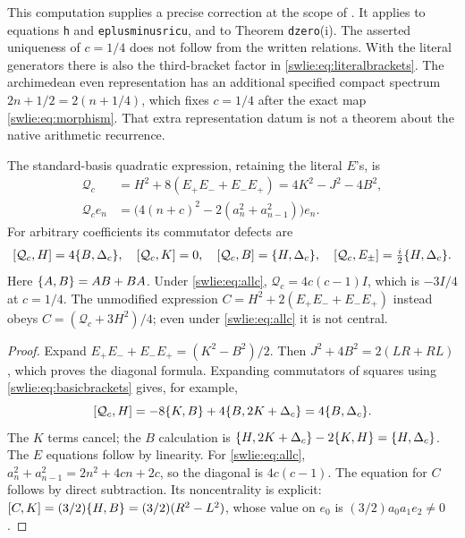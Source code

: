 This computation supplies a precise correction at the scope
of \cite{swlie:CCM}. It applies to equations \texttt{h} and
\texttt{eplusminusricu}, and to Theorem \texttt{dzero}(i).
The asserted uniqueness of $c=1/4$ does not follow from the
written relations. With the literal generators there is
also the third-bracket factor in \eqref{swlie:eq:literalbrackets}.
The archimedean even representation has an additional
specified compact spectrum $2n+1/2=2(n+1/4)$, which fixes
$c=1/4$ after the exact map \eqref{swlie:eq:morphism}.
That extra representation datum is not a theorem about
the native arithmetic recurrence.

\begin{swlieproposition}
\label{swlie:prop:casimir}
The standard-basis quadratic expression, retaining the
literal $E$'s, is
\begin{equation}\label{swlie:eq:Cas}
 \begin{split}
 \mathcal Q_c
 &=H^2+8(E_+E_-+E_-E_+)
   =4K^2-J^2-4B^2,\\
 \mathcal Q_ce_n
 &=\bigl(4(n+c)^2-2(a_n^2+a_{n-1}^2)\bigr)e_n.
 \end{split}
\end{equation}
For arbitrary coefficients its commutator defects are
\begin{equation}\label{swlie:eq:Casdef}
 [\mathcal Q_c,H]=4\{B,\Delta_c\},\quad
 [\mathcal Q_c,K]=0,\quad
 [\mathcal Q_c,B]=\{H,\Delta_c\},\quad
 [\mathcal Q_c,E_\pm]=\tfrac i2\{H,\Delta_c\}.
\end{equation}
Here $\{A,B\}=AB+BA$. Under \eqref{swlie:eq:allc},
$\mathcal Q_c=4c(c-1)I$, which is $-3I/4$ at $c=1/4$.
The unmodified expression
$C=H^2+2(E_+E_-+E_-E_+)$ instead obeys
$C=(\mathcal Q_c+3H^2)/4$; even under
\eqref{swlie:eq:allc} it is not central.
\end{swlieproposition}
\begin{proof}
Expand $E_+E_-+E_-E_+=(K^2-B^2)/2$.
Then $J^2+4B^2=2(LR+RL)$, which proves the diagonal
formula. Expanding commutators of squares using
\eqref{swlie:eq:basicbrackets} gives, for example,
\[
 [\mathcal Q_c,H]
  =-8\{K,B\}+4\{B,2K+\Delta_c\}
  =4\{B,\Delta_c\}.
\]
The $K$ terms cancel; the $B$ calculation is
$\{H,2K+\Delta_c\}-2\{K,H\}=\{H,\Delta_c\}$.
The $E$ equations follow by linearity.
For \eqref{swlie:eq:allc},
$a_n^2+a_{n-1}^2=2n^2+4cn+2c$,
so the diagonal is $4c(c-1)$.
The equation for $C$ follows by direct subtraction.
Its noncentrality is explicit:
$[C,K]=(3/2)\{H,B\}=(3/2)(R^2-L^2)$,
whose value on $e_0$ is $(3/2)a_0a_1e_2\ne0$.
\end{proof}

